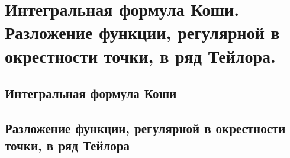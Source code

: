 \chapter{Интегральная формула Коши. Разложение функции, регулярной в окрестности точки, в ряд Тейлора.}
\section{Интегральная формула Коши}


\section{Разложение функции, регулярной в окрестности точки, в ряд Тейлора}